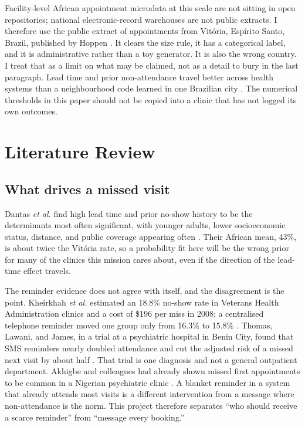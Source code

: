 \documentclass[journal]{IEEEtran}
\begin{document}
Facility-level African appointment microdata at this scale are not sitting in open repositories; national electronic-record warehouses are not public extracts. I therefore use the public extract of appointments from Vit\'oria, Esp\'irito Santo, Brazil, published by Hoppen \cite{hoppen2016}. It clears the size rule, it has a categorical label, and it is administrative rather than a toy generator. It is also the wrong country. I treat that as a limit on what may be claimed, not as a detail to bury in the last paragraph. Lead time and prior non-attendance travel better across health systems than a neighbourhood code learned in one Brazilian city \cite{dantas2018,mohammadi2018}. The numerical thresholds in this paper should not be copied into a clinic that has not logged its own outcomes.

\section{Literature Review}
\subsection{What drives a missed visit}
Dantas \emph{et al.} find high lead time and prior no-show history to be the determinants most often significant, with younger adults, lower socioeconomic status, distance, and public coverage appearing often \cite{dantas2018}. Their African mean, 43\%, is about twice the Vit\'oria rate, so a probability fit here will be the wrong prior for many of the clinics this mission cares about, even if the direction of the lead-time effect travels.

The reminder evidence does not agree with itself, and the disagreement is the point. Kheirkhah \emph{et al.} estimated an 18.8\% no-show rate in Veterans Health Administration clinics and a cost of \$196 per miss in 2008; a centralised telephone reminder moved one group only from 16.3\% to 15.8\% \cite{kheirkhah2016}. Thomas, Lawani, and James, in a trial at a psychiatric hospital in Benin City, found that SMS reminders nearly doubled attendance and cut the adjusted risk of a missed next visit by about half \cite{thomas2017}. That trial is one diagnosis and not a general outpatient department. Akhigbe and colleagues had already shown missed first appointments to be common in a Nigerian psychiatric clinic \cite{akhigbe2014}. A blanket reminder in a system that already attends most visits is a different intervention from a message where non-attendance is the norm. This project therefore separates ``who should receive a scarce reminder'' from ``message every booking.''
\end{document}

